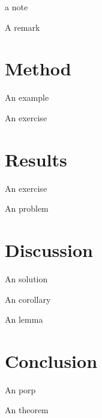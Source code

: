 \documentclass[final]{sta-thesis}
\begin{document}
\begin{note}
a note
\end{note}

\begin{remark}
A remark
\end{remark}

\chapter{Method}
\begin{example}
An example
\end{example}

\begin{exercise}
An exercise
\end{exercise}


\chapter{Results}

\begin{exercise}
An exercise
\end{exercise}

\begin{problem}
An problem
\end{problem}


\chapter{Discussion}

\begin{solution}
An solution
\end{solution}

\begin{corollary}
An corollary
\end{corollary}

\begin{lemma}
An lemma
\end{lemma}

\chapter{Conclusion}

\begin{proposition}
An porp
\end{proposition}

\begin{theorem}
An theorem
\end{theorem}

\backmatter 

\printbibliography
\listoftheorems[ignore={note,remark}]
\end{document}
